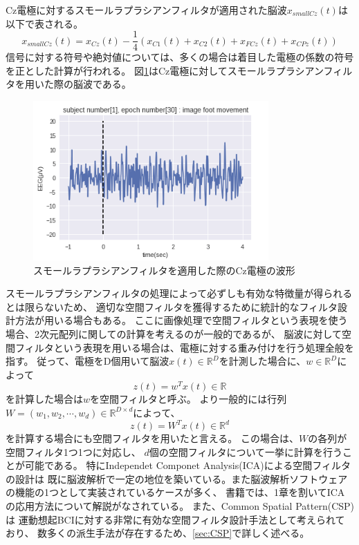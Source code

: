 Cz電極に対するスモールラプラシアンフィルタが適用された脳波\(x_{smallCz}(t)\)は以下で表される。
\begin{equation}
    x_{smallCz}(t) = x_{Cz}(t) - \frac{1}{4}(x_{C1}(t) + x_{C2}(t) + x_{FCz}(t) + x_{CPz}(t))
\end{equation}
信号に対する符号や絶対値については、多くの場合は着目した電極の係数の符号を正とした計算が行われる。
図\ref{fig:Cz}はCz電極に対してスモールラプラシアンフィルタを用いた際の脳波である。
\begin{figure}[t]
    \centering
    \includegraphics[width=9cm]{images/rapCzEEG.png}
    \caption{スモールラプラシアンフィルタを適用した際のCz電極の波形}
    \label{fig:Cz}
\end{figure}
スモールラプラシアンフィルタの処理によって必ずしも有効な特徴量が得られるとは限らないため、
適切な空間フィルタを獲得するために統計的なフィルタ設計方法が用いる場合もある。
ここに画像処理で空間フィルタという表現を使う場合、2次元配列に関しての計算を考えるのが一般的であるが、
脳波に対して空間フィルタという表現を用いる場合は、電極に対する重み付けを行う処理全般を指す。
従って、電極をD個用いて脳波\(x(t) \in \mathbb R^D\)を計測した場合に、\(w \in \mathbb R^D\)によって
\begin{equation}
    z(t) = w^T x(t) \in \mathbb R
\end{equation}
を計算した場合は\(w\)を空間フィルタと呼ぶ。
より一般的には行列\(W = (w_1, w_2, \cdots, w_d) \in \mathbb R^{D \times d}\)によって、
\begin{equation}
    z(t) = W^T x(t) \in \mathbb R^d
\end{equation}
を計算する場合にも空間フィルタを用いたと言える。
この場合は、\(W\)の各列が空間フィルタ1つ1つに対応し、
\(d\)個の空間フィルタについて一挙に計算を行うことが可能である。
特にIndependet Componet Analysis(ICA)による空間フィルタの設計は
既に脳波解析で一定の地位を築いている。また脳波解析ソフトウェアの機能の1つとして実装されているケースが多く、
書籍\cite{脳波解析入門}では、1章を割いてICAの応用方法について解説がなされている。
また、Common Spatial Pattern(CSP)は
運動想起BCIに対する非常に有効な空間フィルタ設計手法として考えられており、
数多くの派生手法が存在するため、\ref{sec:CSP}で詳しく述べる。

